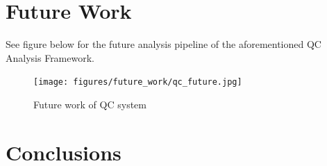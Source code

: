 \documentclass[12pt]{report}
\begin{document}
\chapter{Future Work}

See figure below for the future analysis pipeline of the aforementioned QC Analysis Framework.

\begin{figure}
    \centering
    \texttt{[image: figures/future\_work/qc\_future.jpg]}
    \caption{Future work of QC system}
    \label{fig:my_label}
\end{figure}
\chapter{Conclusions}



\end{document}
